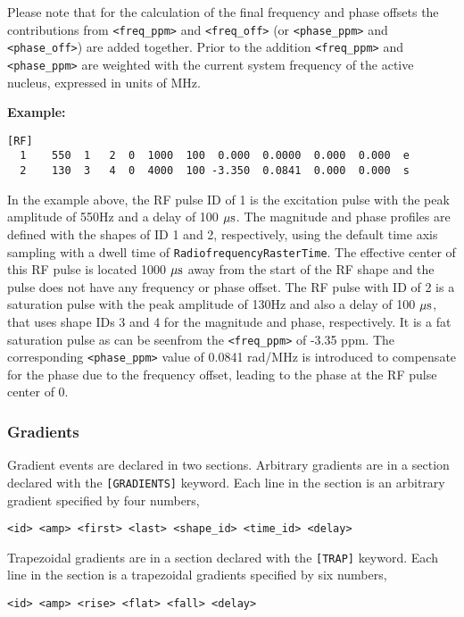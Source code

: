 \documentclass{article}
\begin{document}
Please note that for the calculation of the final frequency and phase offsets the contributions from \verb.<freq_ppm>. and \verb.<freq_off>. (or \verb.<phase_ppm>. and \verb.<phase_off>.) are added together. Prior to the addition \verb.<freq_ppm>. and \verb.<phase_ppm>. are weighted with the current system frequency of the active nucleus, expressed in units of MHz.

\begin{minipage}{\textwidth}
\textbf{Example:}
\begin{lstlisting}
[RF]
  1    550  1   2  0  1000  100  0.000  0.0000  0.000  0.000  e
  2    130  3   4  0  4000  100 -3.350  0.0841  0.000  0.000  s
\end{lstlisting}
\end{minipage}

In the example above, the RF pulse ID of 1 is the excitation pulse with the peak amplitude of 550Hz and a delay of 100 $\rm \mu s$. The magnitude and phase profiles are defined with the shapes of ID 1 and 2, respectively, using the default time axis sampling with a dwell time of \verb.RadiofrequencyRasterTime.. The effective center of this RF pulse is located 1000 $\rm \mu s$ away from the start of the RF shape and the pulse does not have any frequency or phase offset. The RF pulse with ID of 2 is a saturation pulse with the peak amplitude of 130Hz and also a delay of 100 $\rm \mu s$, that uses shape IDs 3 and 4 for the magnitude and phase, respectively. It is a fat saturation pulse as can be seenfrom the \verb.<freq_ppm>. of -3.35 ppm. The corresponding  \verb.<phase_ppm>. value of 0.0841 rad/MHz is introduced to compensate for the phase due to the frequency offset, leading to the phase at the RF pulse center of 0.\\

\subsubsection{Gradients}
Gradient events are declared in two sections. Arbitrary gradients are in a section declared with the \verb.[GRADIENTS]. keyword. Each line in the section is an arbitrary gradient specified by four numbers,
\begin{lstlisting}
<id> <amp> <first> <last> <shape_id> <time_id> <delay>
\end{lstlisting}
Trapezoidal gradients are in a section declared with the \verb.[TRAP]. keyword. Each line in the section is a trapezoidal gradients specified by six numbers,
\begin{lstlisting}
<id> <amp> <rise> <flat> <fall> <delay>
\end{lstlisting}
\end{document}
